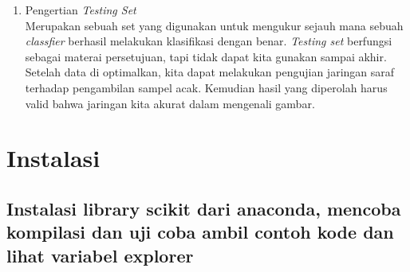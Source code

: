 \documentclass{article}
\begin{document}
\begin{enumerate}
    \item Pengertian \textit{Testing Set}\\
    Merupakan sebuah set yang digunakan untuk mengukur sejauh mana sebuah \textit{classfier} berhasil melakukan klasifikasi dengan benar. \textit{Testing set} berfungsi sebagai materai persetujuan, tapi tidak dapat kita gunakan sampai akhir. Setelah data di optimalkan, kita dapat melakukan pengujian jaringan saraf terhadap pengambilan sampel acak. Kemudian hasil yang diperolah harus valid bahwa jaringan kita akurat dalam mengenali gambar.
    
\end{enumerate}
 
\section{Instalasi}

\subsection{Instalasi library scikit dari anaconda, mencoba kompilasi dan uji coba ambil contoh kode dan lihat variabel explorer}
\end{document}
